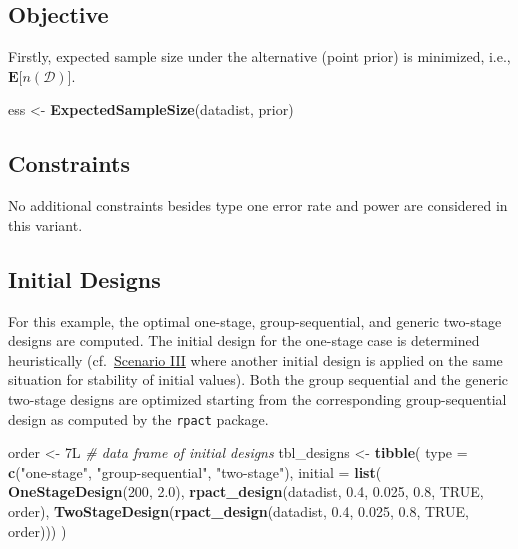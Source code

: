 \documentclass[
]{book}
\newenvironment{Shaded}{\begin{snugshade}}{\end{snugshade}}
\newcommand{\CommentTok}[1]{\textcolor[rgb]{0.56,0.35,0.01}{\textit{#1}}}
\newcommand{\DataTypeTok}[1]{\textcolor[rgb]{0.13,0.29,0.53}{#1}}
\newcommand{\DecValTok}[1]{\textcolor[rgb]{0.00,0.00,0.81}{#1}}
\newcommand{\FloatTok}[1]{\textcolor[rgb]{0.00,0.00,0.81}{#1}}
\newcommand{\KeywordTok}[1]{\textcolor[rgb]{0.13,0.29,0.53}{\textbf{#1}}}
\newcommand{\NormalTok}[1]{#1}
\newcommand{\OtherTok}[1]{\textcolor[rgb]{0.56,0.35,0.01}{#1}}
\newcommand{\StringTok}[1]{\textcolor[rgb]{0.31,0.60,0.02}{#1}}
\begin{document}
\hypertarget{objective}{%
\subsection{Objective}\label{objective}}

Firstly, expected sample size under the alternative (point prior)
is minimized, i.e.,
\(\boldsymbol{E}\big[n(\mathcal{D})\big]\).

\begin{Shaded}
\begin{Highlighting}[]
\NormalTok{ess \textless{}{-}}\StringTok{ }\KeywordTok{ExpectedSampleSize}\NormalTok{(datadist, prior)}
\end{Highlighting}
\end{Shaded}

\hypertarget{constraints}{%
\subsection{Constraints}\label{constraints}}

No additional constraints besides type one error rate and power
are considered in this variant.

\hypertarget{initial-designs}{%
\subsection{Initial Designs}\label{initial-designs}}

For this example, the optimal one-stage, group-sequential, and generic
two-stage designs are computed.
The initial design for the one-stage case is determined heuristically
(cf.~\protect\hyperlink{scenarioIII}{Scenario III} where another initial design is applied
on the same situation for stability of initial values).
Both the group sequential and the generic two-stage designs are
optimized starting from the corresponding group-sequential design as
computed by the \texttt{rpact} package.

\begin{Shaded}
\begin{Highlighting}[]
\NormalTok{order \textless{}{-}}\StringTok{ }\NormalTok{7L}
\CommentTok{\# data frame of initial designs }
\NormalTok{tbl\_designs \textless{}{-}}\StringTok{ }\KeywordTok{tibble}\NormalTok{(}
    \DataTypeTok{type    =} \KeywordTok{c}\NormalTok{(}\StringTok{"one{-}stage"}\NormalTok{, }\StringTok{"group{-}sequential"}\NormalTok{, }\StringTok{"two{-}stage"}\NormalTok{),}
    \DataTypeTok{initial =} \KeywordTok{list}\NormalTok{(}
        \KeywordTok{OneStageDesign}\NormalTok{(}\DecValTok{200}\NormalTok{, }\FloatTok{2.0}\NormalTok{),}
        \KeywordTok{rpact\_design}\NormalTok{(datadist, }\FloatTok{0.4}\NormalTok{, }\FloatTok{0.025}\NormalTok{, }\FloatTok{0.8}\NormalTok{, }\OtherTok{TRUE}\NormalTok{, order),}
        \KeywordTok{TwoStageDesign}\NormalTok{(}\KeywordTok{rpact\_design}\NormalTok{(datadist, }\FloatTok{0.4}\NormalTok{, }\FloatTok{0.025}\NormalTok{, }\FloatTok{0.8}\NormalTok{, }\OtherTok{TRUE}\NormalTok{, order))) )}
\end{Highlighting}
\end{Shaded}
\end{document}
